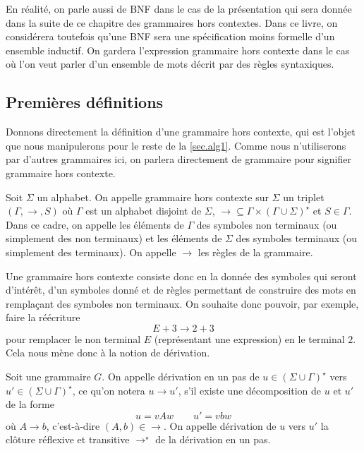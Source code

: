 \begin{remark}
  En réalité, on parle aussi de BNF dans le cas de la présentation qui sera
  donnée dans la suite de ce chapitre des grammaires hors contextes. Dans ce
  livre, on considérera toutefois qu'une BNF sera une spécification moins
  formelle d'un ensemble inductif. On gardera l'expression \og grammaire hors
  contexte\fg{} dans le cas où l'on veut parler d'un ensemble de mots décrit par
  des règles syntaxiques.
\end{remark}

\subsection{Premières définitions}

Donnons directement la définition d'une grammaire hors contexte, qui est l'objet
que nous manipulerons pour le reste de la \cref{sec.alg1}. Comme nous
n'utiliserons par d'autres grammaires ici, on parlera directement de grammaire
pour signifier \og grammaire hors contexte\fg{}.

\begin{definition}
  Soit $\Sigma$ un alphabet. On appelle grammaire hors contexte sur $\Sigma$ un
  triplet $(\Gamma,\to,S)$ où $\Gamma$ est un alphabet disjoint de $\Sigma$,
  $\to\subseteq \Gamma\times (\Gamma \cup \Sigma)^\star$ et $S \in \Gamma$. Dans
  ce cadre, on appelle les éléments de $\Gamma$ des symboles non terminaux
  (ou simplement des non terminaux) et les éléments de $\Sigma$ des symboles
  terminaux (ou simplement des terminaux). On appelle $\to$ les règles de la
  grammaire.
\end{definition}

Une grammaire hors contexte consiste donc en la donnée des symboles qui seront
d'intérêt, d'un symboles donné et de règles permettant de construire des mots
en remplaçant des symboles non terminaux. On souhaite donc pouvoir, par exemple,
faire la réécriture
\[E + 3 \to 2 + 3\]
pour remplacer le non terminal $E$ (représentant une expression) en le terminal
$2$. Cela nous mène donc à la notion de dérivation.

\begin{definition}[Dérivation]
  Soit une grammaire $G$. On appelle dérivation en un pas de
  $u \in (\Sigma\cup \Gamma)^\star$ vers $u' \in (\Sigma\cup\Gamma)^\star$,
  ce qu'on notera $u \to u'$, s'il existe une décomposition de $u$ et $u'$ de la
  forme
  \[u = vAw\qquad u' = vbw\]
  où $A \to b$, c'est-à-dire $(A,b) \in \to$. On appelle dérivation de $u$ vers
  $u'$ la clôture réflexive et transitive $\to^\star$ de la dérivation en un pas.
\end{definition}

